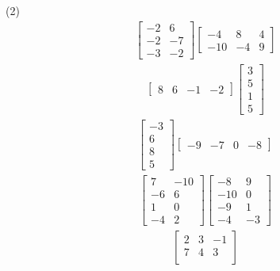 \begin{tasks}[resume, style=enumerate](2)
\task
  \begin{align*}
    \begin{bmatrix}
      -2 & 6 \\
      -2 & -7 \\
      -3 & -2
    \end{bmatrix}
    \begin{bmatrix}
      -4 & 8 & 4 \\
      -10 & -4 & 9
    \end{bmatrix}
  \end{align*}
\task
  \begin{align*}
    \begin{bmatrix} 8 & 6 & -1 & -2 \end{bmatrix}
    \begin{bmatrix} 3 \\ 5 \\ 1 \\ 5 \end{bmatrix}
  \end{align*}
\task
  \begin{align*}
    \begin{bmatrix} -3 \\ 6 \\ 8 \\ 5 \end{bmatrix}
    \begin{bmatrix} -9 & -7 & 0 & -8 \end{bmatrix}
  \end{align*}
\task
  \begin{align*}
    \begin{bmatrix}
      7 & -10 \\
      -6 & 6 \\
      1 & 0 \\
      -4 & 2
    \end{bmatrix}
    \begin{bmatrix}
      -8 & 9 \\
      -10 & 0 \\
      -9 & 1 \\
      -4 & -3
    \end{bmatrix}
  \end{align*}
\task
  \begin{align*}
    \begin{bmatrix}
      2 & 3 & -1 \\
      7 & 4 & 3 \\

\end{bmatrix}
\end{align*}
\end{tasks}
